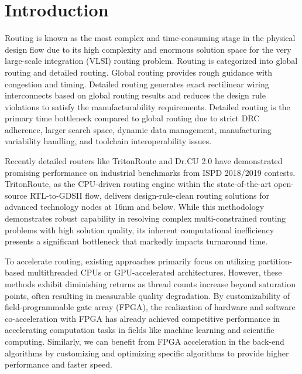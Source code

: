 \section{Introduction}

Routing is known as the most complex and time-consuming stage in the physical design flow 
due to its high complexity and enormous solution space for the very large-scale integration (VLSI) routing problem. 
Routing is categorized into global routing and detailed routing. Global routing provides rough guidance with congestion and timing. 
Detailed routing generates exact rectilinear wiring interconnects based on global routing results and 
reduces the design rule violations to satisfy the manufacturability requirements. 
Detailed routing is the primary time bottleneck compared to global routing 
due to strict DRC adherence, larger search space, dynamic data management, manufacturing variability handling, and toolchain interoperability issues.

Recently detailed routers like TritonRoute\cite{Tr2021} and Dr.CU 2.0\cite{Dr2019} 
have demonstrated promising performance on industrial benchmarks from ISPD 2018/2019 contests. 
TritonRoute, as the CPU-driven routing engine within the state-of-the-art open-source RTL-to-GDSII flow, delivers design-rule-clean routing solutions for advanced technology nodes at 16nm and below. 
While this methodology demonstrates robust capability in resolving complex multi-constrained routing problems with high solution quality, 
its inherent computational inefficiency presents a significant bottleneck that markedly impacts turnaround time.

To accelerate routing, existing approaches primarily focus on utilizing partition-based multithreaded CPUs or GPU-accelerated architectures. 
However, these methods exhibit diminishing returns as thread counts increase beyond saturation points, often resulting in measurable quality degradation. 
By customizability of field-programmable gate array (FPGA), the realization of hardware and software co-acceleration with FPGA 
has already achieved competitive performance in accelerating computation tasks in fields like machine learning and scientific computing. 
Similarly, we can benefit from FPGA acceleration in the back-end algorithms 
by customizing and optimizing specific algorithms to provide higher performance and faster speed.



